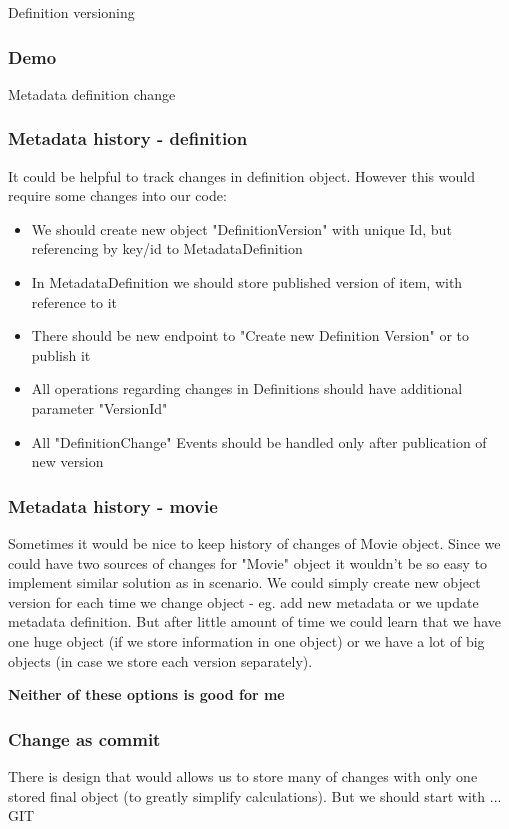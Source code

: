 \documentclass{beamer}
\begin{document}
\begin{section}{Definition versioning}
\begin{frame}
\frametitle{Demo}
Metadata definition change
\end{frame}

\begin{frame}
\frametitle{Metadata history - definition}
It could be helpful to track changes in definition object. However this would require some changes into our code: \pause
\begin{itemize}
	\item We should create new object "DefinitionVersion" with unique Id, but referencing by key/id to MetadataDefinition \pause
	\item In MetadataDefinition we should store published version of item, with reference to it \pause
	\item There should be new endpoint to "Create new Definition Version" or to publish it \pause
	\item All operations regarding changes in Definitions should have additional parameter "VersionId" \pause
	\item All "DefinitionChange" Events should be handled only after publication of new version
\end{itemize}
\end{frame}

\begin{frame}
\frametitle{Metadata history - movie}
Sometimes it would be nice to keep history of changes of Movie object. Since we could have two sources of changes for "Movie" object it wouldn't be so easy to implement similar solution as in scenario. We could simply create new object version for each time we change object - eg. add new metadata or we update metadata definition. But after little amount of time we could learn that we have one huge object (if we store information in one object) or we have a lot of big objects (in case we store each version separately). \pause
\newline
\begin{center}
	\textbf{Neither of these options is good for me}
\end{center}
\end{frame}

\begin{frame}
\frametitle{Change as commit}
There is design that would allows us to store many of changes with only one stored final object (to greatly simplify calculations). \newline \pause
But we should start with  ...  \pause GIT


\end{frame}
\end{section}
\end{document}
